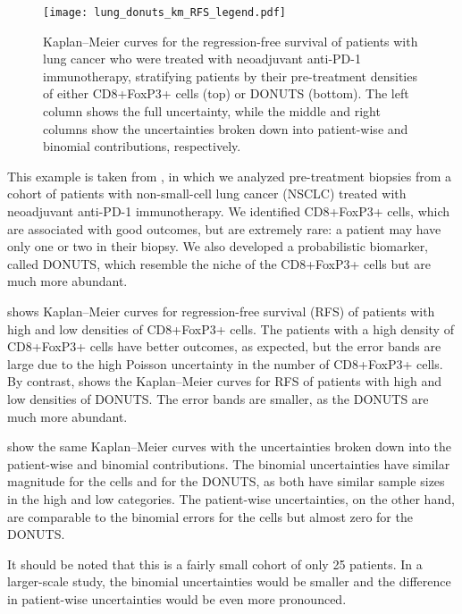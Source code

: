 \documentclass[article]{jss}
\newcommand{\KM}{Kaplan--Meier} %
\begin{document}
\begin{figure}[ht]
\begin{subfigure}[c]{\figwidth}
    \caption{\label{fig:lung-dataset-donuts-binomial}}
  \end{subfigure}
  \begin{minipage}[c]{\legendwidth}
    \centering
    \movelegendup
    \texttt{[image: lung\_donuts\_km\_RFS\_legend.pdf]}
  \end{minipage}
  \caption{\label{fig:lung-dataset} \KM{} curves for the regression-free survival of patients with lung cancer who were treated with neoadjuvant anti-PD-1 immunotherapy, stratifying patients by their pre-treatment densities of either CD8+FoxP3+ cells (top) or DONUTS (bottom). The left column shows the full uncertainty, while the middle and right columns show the uncertainties broken down into patient-wise and binomial contributions, respectively.}
\end{figure}

This example is taken from \citet{DONUTS}, in which we analyzed pre-treatment biopsies from a cohort of patients with non-small-cell lung cancer (NSCLC) treated with neoadjuvant anti-PD-1 immunotherapy. We identified CD8+FoxP3+ cells, which are associated with good outcomes, but are extremely rare: a patient may have only one or two in their biopsy. We also developed a probabilistic biomarker, called DONUTS, which resemble the niche of the CD8+FoxP3+ cells but are much more abundant.

 shows \KM{} curves for regression-free survival (RFS) of patients with high and low densities of CD8+FoxP3+ cells. The patients with a high density of CD8+FoxP3+ cells have better outcomes, as expected, but the error bands are large due to the high Poisson uncertainty in the number of CD8+FoxP3+ cells. By contrast,  shows the \KM{} curves for RFS of patients with high and low densities of DONUTS\@. The error bands are smaller, as the DONUTS are much more abundant.

 show the same \KM{} curves with the uncertainties broken down into the patient-wise and binomial contributions. The binomial uncertainties have similar magnitude for the cells and for the DONUTS, as both have similar sample sizes in the high and low categories. The patient-wise uncertainties, on the other hand, are comparable to the binomial errors for the cells but almost zero for the DONUTS\@.

It should be noted that this is a fairly small cohort of only 25 patients. In a larger-scale study, the binomial uncertainties would be smaller and the difference in patient-wise uncertainties would be even more pronounced.
\end{document}
